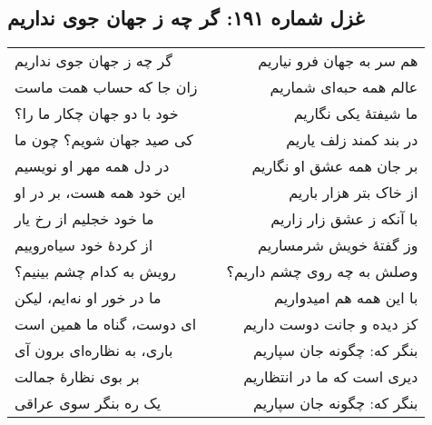 \begin{center}
\section*{غزل شماره ۱۹۱: گر چه ز جهان جوی نداریم}
\label{sec:191}
\begin{longtable}{l p{0.5cm} r}
گر چه ز جهان جوی نداریم
&&
هم سر به جهان فرو نیاریم
\\
زان جا که حساب همت ماست
&&
عالم همه حبه‌ای شماریم
\\
خود با دو جهان چکار ما را؟
&&
ما شیفتهٔ یکی نگاریم
\\
کی صید جهان شویم؟ چون ما
&&
در بند کمند زلف یاریم
\\
در دل همه مهر او نویسیم
&&
بر جان همه عشق او نگاریم
\\
این خود همه هست، بر در او
&&
از خاک بتر هزار باریم
\\
ما خود خجلیم از رخ یار
&&
با آنکه ز عشق زار زاریم
\\
از کردهٔ خود سیاه‌روییم
&&
وز گفتهٔ خویش شرمساریم
\\
رویش به کدام چشم بینیم؟
&&
وصلش به چه روی چشم داریم؟
\\
ما در خور او نه‌ایم، لیکن
&&
با این همه هم امیدواریم
\\
ای دوست، گناه ما همین است
&&
کز دیده و جانت دوست داریم
\\
باری، به نظاره‌ای برون آی
&&
بنگر که: چگونه جان سپاریم
\\
بر بوی نظارهٔ جمالت
&&
دیری است که ما در انتظاریم
\\
یک ره بنگر سوی عراقی
&&
بنگر که: چگونه جان سپاریم
\\
\end{longtable}
\end{center}
